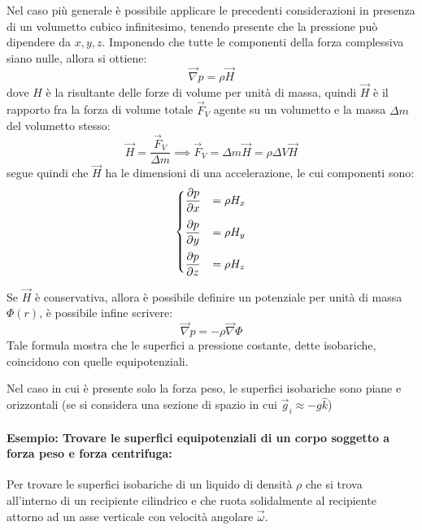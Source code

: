 \documentclass[11pt, a4paper, openright]{book}
\theoremstyle{plain}
\theoremstyle{definition}
\begin{document}
Nel caso più generale è possibile applicare le precedenti considerazioni in presenza di un volumetto cubico infinitesimo, tenendo presente che la pressione può dipendere da $x,y,z$. Imponendo che tutte le componenti della forza complessiva siano nulle, allora si ottiene:
\begin{equation}
    \vec{\nabla}p = \rho\vec{H}
\end{equation}
dove $H$ è la risultante delle forze di volume per unità di massa, quindi $\vec{H}$ è il rapporto fra la forza di volume totale $\vec{F}_V$ agente su un volumetto e la massa $\Delta m$ del volumetto stesso:
\begin{equation}
    \vec{H} = \frac{\vec{F}_V}{\Delta m} \implies \vec{F}_V = \Delta m \vec{H} = \rho\Delta V \vec{H} 
\end{equation} 
segue quindi che $\vec{H}$ ha le dimensioni di una accelerazione, le cui componenti sono:
\begin{equation}
    \begin{cases}
        \displaystyle \pdv{p}{x} & = \rho H_x \\[1em]
        \displaystyle \pdv{p}{y} & = \rho H_y \\[1em]
        \displaystyle \pdv{p}{z} & = \rho H_z \\
    \end{cases}
\end{equation}

Se $\vec{H}$ è conservativa, allora è possibile definire un potenziale per unità di massa $\Phi(r)$, è possibile infine scrivere:
\begin{equation}
    \vec{\nabla}p = -\rho \vec{\nabla}\Phi
\end{equation}
Tale formula mostra che le superfici a pressione costante, dette isobariche, coincidono con quelle equipotenziali.

Nel caso in cui è presente solo la forza peso, le superfici isobariche sono piane e orizzontali (se si considera una sezione di spazio in cui $\vec{g}_i \approx -g\hat{k}$)
 
\paragraph{Esempio: Trovare le superfici equipotenziali di un corpo soggetto a forza peso e forza centrifuga:} Per trovare le superfici isobariche di un liquido di densità $\rho$ che si trova all'interno di un recipiente cilindrico e che ruota solidalmente al recipiente attorno ad un asse verticale con velocità angolare $\vec{\omega}$.
\end{document}
